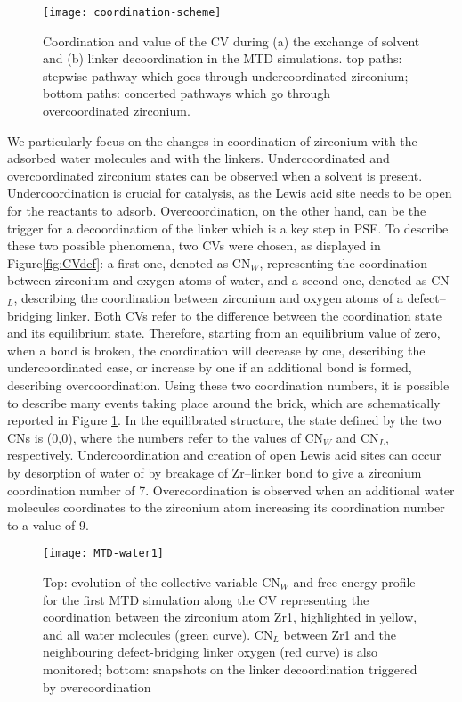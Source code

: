 \begin{figure}[!htbp]
	\centering
	\texttt{[image: coordination-scheme]}
	\caption{ Coordination and value of the CV during (a) the exchange of solvent and (b) linker decoordination in the MTD simulations. top paths: stepwise pathway which goes through undercoordinated zirconium; bottom paths: concerted pathways which go through overcoordinated zirconium.}
	\label{fig:coordination-scheme}
\end{figure}
We particularly focus on the changes in coordination of zirconium with the adsorbed water molecules and with the linkers. Undercoordinated and overcoordinated zirconium states can be observed when a solvent is present. Undercoordination is crucial for catalysis, as the Lewis acid site needs to be open for the reactants to adsorb. Overcoordination, on the other hand, can be the trigger for a decoordination of the linker which is a key step in PSE.
\npar
To describe these two possible phenomena, two CVs were chosen, as displayed in Figure\ref{fig:CVdef}: a first one, denoted as CN$_W$, representing the coordination between zirconium and oxygen atoms of water, and a second one, denoted as CN$_L$, describing the coordination between zirconium and oxygen atoms of a defect--bridging linker. Both CVs refer to the difference between the coordination state and its equilibrium state. Therefore, starting from an equilibrium value of zero, when a bond is broken, the coordination will decrease by one, describing the undercoordinated case, or increase by one if an additional bond is formed, describing overcoordination. Using these two coordination numbers, it is possible to describe many events taking place around the brick, which are schematically reported in Figure \ref{fig:coordination-scheme}. In the equilibrated structure, the state defined by the two CNs is (0,0), where the numbers refer to the values of CN$_W$ and CN$_L$, respectively. Undercoordination and creation of open Lewis acid sites can occur by desorption of water of by breakage of Zr--linker bond to give a zirconium coordination number of 7. Overcoordination is observed when an additional water molecules coordinates to the zirconium atom increasing its coordination number to a value of 9. 
\npar
\begin{figure}[!htbp]
	\centering
	\texttt{[image: MTD-water1]}
	\caption{Top: evolution of the collective variable CN$_W$ and free energy profile for the first MTD simulation along the CV representing the coordination between the zirconium atom Zr1, highlighted in yellow, and all water molecules (green curve). CN$_L$ between Zr1 and the neighbouring defect-bridging linker oxygen (red curve) is also monitored; bottom: snapshots on the linker decoordination triggered by overcoordination}
	\label{fig:MTD-water1}
\end{figure}
